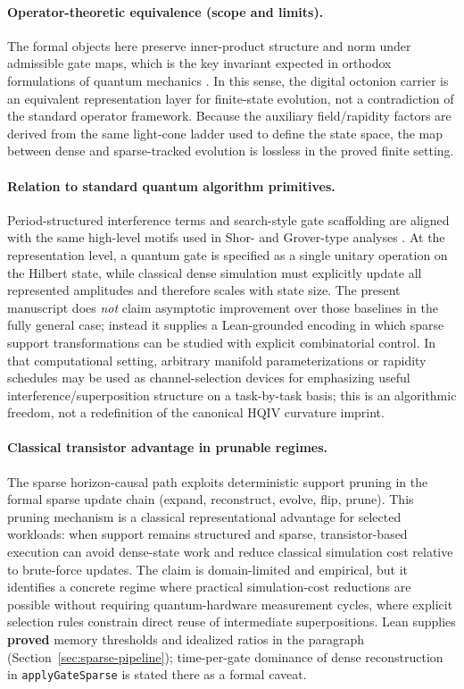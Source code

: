\documentclass[11pt,a4paper]{article}
\newcommand{\lean}[1]{\path{#1}}
\theoremstyle{remark}
\begin{document}
\paragraph{Operator-theoretic equivalence (scope and limits).}
The formal objects here preserve inner-product structure and norm under admissible gate maps, which is the key invariant expected in orthodox formulations of quantum mechanics \cite{vonNeumann1955,dirac1930}. In this sense, the digital octonion carrier is an equivalent representation layer for finite-state evolution, not a contradiction of the standard operator framework. Because the auxiliary field/rapidity factors are derived from the same light-cone ladder used to define the state space, the map between dense and sparse-tracked evolution is lossless in the proved finite setting.

\paragraph{Relation to standard quantum algorithm primitives.}
Period-structured interference terms and search-style gate scaffolding are aligned with the same high-level motifs used in Shor- and Grover-type analyses \cite{shor1997,grover1996}. At the representation level, a quantum gate is specified as a single unitary operation on the Hilbert state, while classical dense simulation must explicitly update all represented amplitudes and therefore scales with state size. The present manuscript does \emph{not} claim asymptotic improvement over those baselines in the fully general case; instead it supplies a Lean-grounded encoding in which sparse support transformations can be studied with explicit combinatorial control. In that computational setting, arbitrary manifold parameterizations or rapidity schedules may be used as channel-selection devices for emphasizing useful interference/superposition structure on a task-by-task basis; this is an algorithmic freedom, not a redefinition of the canonical HQIV curvature imprint.

\paragraph{Classical transistor advantage in prunable regimes.}
The sparse horizon-causal path exploits deterministic support pruning in the formal sparse update chain (expand, reconstruct, evolve, flip, prune). This pruning mechanism is a classical representational advantage for selected workloads: when support remains structured and sparse, transistor-based execution can avoid dense-state work and reduce classical simulation cost relative to brute-force updates. The claim is domain-limited and empirical, but it identifies a concrete regime where practical simulation-cost reductions are possible without requiring quantum-hardware measurement cycles, where explicit selection rules constrain direct reuse of intermediate superpositions.
Lean supplies \textbf{proved} memory thresholds and idealized ratios in the \lean{SparseSimulationDensityCrossover} paragraph (Section~\ref{sec:sparse-pipeline}); time-per-gate dominance of dense reconstruction in \texttt{applyGateSparse} is stated there as a formal caveat.
\end{document}
